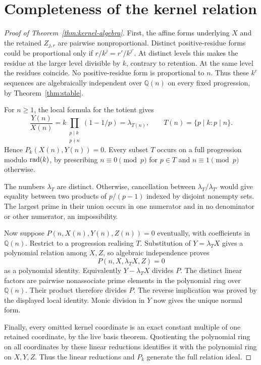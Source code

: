 \documentclass[11pt,a4paper]{article}
\theoremstyle{definition}\newtheorem{definition}[theorem]{Definition}
\theoremstyle{remark}\newtheorem{remark}[theorem]{Remark}
\newcommand{\Q}{\mathbb Q}\newcommand{\R}{\mathbb R}\newcommand{\Z}{\mathbb Z}\newcommand{\N}{\mathbb N}
\begin{document}
\section{Completeness of the kernel relation}\label{sec:complete}
\begin{proof}[Proof of Theorem~\ref{thm:kernel-algebra}]
First, the affine forms underlying $X$ and the retained $Z_{j,r}$ are pairwise
nonproportional. Distinct positive-residue forms could be proportional only if
$r/k^j=r'/k^{j'}$. At distinct levels this makes the residue at the larger level
divisible by $k$, contrary to retention. At the same level the residues coincide.
No positive-residue form is proportional to $n$.
Thus these $k^e$ sequences are algebraically independent over $\Q(n)$ on every
fixed progression, by Theorem~\ref{thm:stable}.

For $n\ge1$, the local formula for the totient gives
\[
 \frac{Y(n)}{X(n)}
 =k\prod_{\substack{p\mid k\\p\nmid n}}(1-1/p)
 =\lambda_{T(n)},\qquad T(n)=\{p\mid k:p\mid n\}.
\]
Hence $P_k(X(n),Y(n))=0$.
Every subset $T$ occurs on a full progression modulo $\operatorname{rad}(k)$, by prescribing
$n\equiv0\pmod p$ for $p\in T$ and $n\equiv1\pmod p$ otherwise.

The numbers $\lambda_T$ are distinct. Otherwise, cancellation between
$\lambda_T/\lambda_{T'}$ would give equality between two products of
$p/(p-1)$ indexed by disjoint nonempty sets. The largest prime in their union
occurs in one numerator and in no denominator or other numerator, an impossibility.

Now suppose $P(n,X(n),Y(n),Z(n))=0$ eventually, with coefficients in $\Q(n)$.
Restrict to a progression realising $T$. Substitution of $Y=\lambda_T X$
gives a polynomial relation among $X,Z$, so algebraic independence proves
\[
 P(n,X,\lambda_T X,Z)=0
\]
as a polynomial identity. Equivalently $Y-\lambda_T X$ divides $P$.
The distinct linear factors are pairwise nonassociate prime elements in the
polynomial ring over $\Q(n)$. Their product therefore divides $P$.
The reverse implication was proved by the displayed local identity.
Monic division in $Y$ now gives the unique normal form.

Finally, every omitted kernel coordinate is an exact constant multiple of one
retained coordinate, by the live basis theorem. Quotienting the polynomial ring
on all coordinates by these linear reductions identifies it with the polynomial
ring on $X,Y,Z$. Thus the linear reductions and $P_k$ generate the full relation ideal.
\end{proof}
\end{document}
